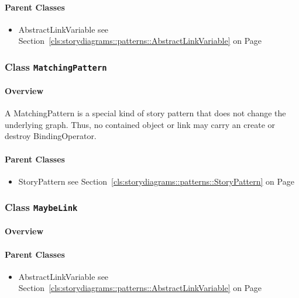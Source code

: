 	



\paragraph{Parent Classes}
\begin{itemize}
\item AbstractLinkVariable see Section~\ref{cls:storydiagrams::patterns::AbstractLinkVariable} on Page~\pageref{cls:storydiagrams::patterns::AbstractLinkVariable}\end{itemize}
\subsubsection{\Large{Class \bfseries \texttt{MatchingPattern}\normalfont}}
\label{cls:storydiagrams::patterns::MatchingPattern} 
\paragraph{Overview}

	
			
A MatchingPattern is a special kind of story pattern that does not change the underlying graph. Thus, no contained object or link may carry an create or destroy BindingOperator.	
		
	



\paragraph{Parent Classes}
\begin{itemize}
\item StoryPattern see Section~\ref{cls:storydiagrams::patterns::StoryPattern} on Page~\pageref{cls:storydiagrams::patterns::StoryPattern}\end{itemize}
\subsubsection{\Large{Class \bfseries \texttt{MaybeLink}\normalfont}}
\label{cls:storydiagrams::patterns::MaybeLink} 
\paragraph{Overview}

	



\paragraph{Parent Classes}
\begin{itemize}
\item AbstractLinkVariable see Section~\ref{cls:storydiagrams::patterns::AbstractLinkVariable} on Page~\pageref{cls:storydiagrams::patterns::AbstractLinkVariable}\end{itemize}
